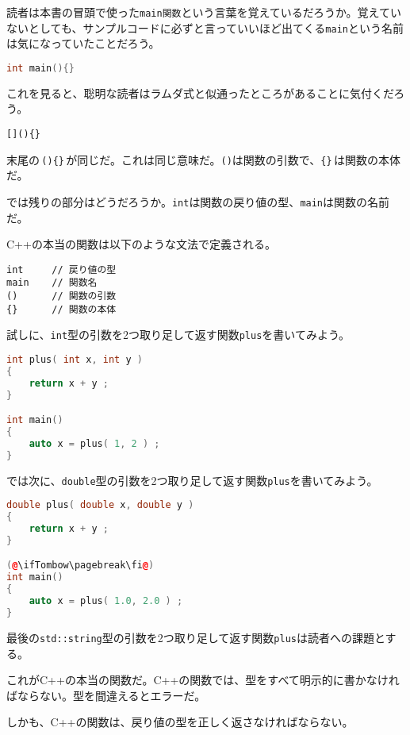 読者は本書の冒頭で使った\texttt{main関数}という言葉を覚えているだろうか。覚えていないとしても、サンプルコードに必ずと言っていいほど出てくる\texttt{main}という名前は気になっていたことだろう。

\begin{lstlisting}[language={C++}]
int main(){}
\end{lstlisting}

これを見ると、聡明な読者はラムダ式と似通ったところがあることに気付くだろう。

\begin{lstlisting}[style=grammar]
[](){}
\end{lstlisting}

末尾の\,\texttt{()\{\}}\,が同じだ。これは同じ意味だ。\texttt{()}は関数の引数で、\texttt{\{\}}\,は関数の本体だ。

では残りの部分はどうだろうか。\texttt{int}は関数の戻り値の型、\texttt{main}は関数の名前だ。

C++の本当の関数は以下のような文法で定義される。

\begin{lstlisting}[style=grammar]
int     // 戻り値の型
main    // 関数名
()      // 関数の引数
{}      // 関数の本体
\end{lstlisting}

試しに、\texttt{int}型の引数を2つ取り足して返す関数\texttt{plus}を書いてみよう。

\begin{lstlisting}[language={C++}]
int plus( int x, int y )
{
    return x + y ;
}

int main()
{
    auto x = plus( 1, 2 ) ;
}
\end{lstlisting}

では次に、\texttt{double}型の引数を2つ取り足して返す関数\texttt{plus}を書いてみよう。

\begin{lstlisting}[language={C++}]
double plus( double x, double y )
{
    return x + y ;
}

(@\ifTombow\pagebreak\fi@)
int main()
{
    auto x = plus( 1.0, 2.0 ) ;
}
\end{lstlisting}

最後の\texttt{std::string}型の引数を2つ取り足して返す関数\texttt{plus}は読者への課題とする。

これがC++の本当の関数だ。C++の関数では、型をすべて明示的に書かなければならない。型を間違えるとエラーだ。

しかも、C++の関数は、戻り値の型を正しく返さなければならない。

